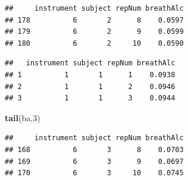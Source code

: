 \documentclass[
]{book}
\newenvironment{Shaded}{\begin{snugshade}}{\end{snugshade}}
\newcommand{\DecValTok}[1]{\textcolor[rgb]{0.00,0.00,0.81}{#1}}
\newcommand{\DocumentationTok}[1]{\textcolor[rgb]{0.56,0.35,0.01}{\textbf{\textit{#1}}}}
\newcommand{\FunctionTok}[1]{\textcolor[rgb]{0.13,0.29,0.53}{\textbf{#1}}}
\newcommand{\NormalTok}[1]{#1}
\newcommand{\OtherTok}[1]{\textcolor[rgb]{0.56,0.35,0.01}{#1}}
\newcommand{\SpecialCharTok}[1]{\textcolor[rgb]{0.81,0.36,0.00}{\textbf{#1}}}
\begin{document}
\begin{verbatim}
##     instrument subject repNum breathAlc
## 178          6       2      8    0.0597
## 179          6       2      9    0.0599
## 180          6       2     10    0.0590
\end{verbatim}

\begin{Shaded}
\end{Shaded}

\begin{verbatim}
##   instrument subject repNum breathAlc
## 1          1       1      1    0.0938
## 2          1       1      2    0.0946
## 3          1       1      3    0.0944
\end{verbatim}

\begin{Shaded}
\begin{Highlighting}[]
\FunctionTok{tail}\NormalTok{(ba,}\DecValTok{3}\NormalTok{)}
\end{Highlighting}
\end{Shaded}

\begin{verbatim}
##     instrument subject repNum breathAlc
## 168          6       3      8    0.0703
## 169          6       3      9    0.0697
## 170          6       3     10    0.0745
\end{verbatim}
\end{document}
